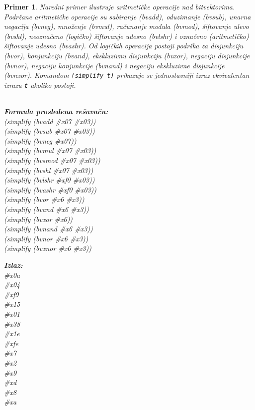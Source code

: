 \documentclass[12pt,oneside]{memoir}
\newtheorem{primer}{Primer}
\begin{document}
\begin{primer} Naredni primer ilustruje aritmetičke operacije nad bitvektorima. Podržane aritmetičke operacije su sabiranje (bvadd), oduzimanje (bvsub), unarna negacija (bvneg), množenje (bvmul), računanje modula (bvmod), šiftovanje ulevo (bvshl), neoznačeno (logičko) šiftovanje udesno (bvlshr) i označeno (aritmetičko) šiftovanje udesno (bvashr). Od logičkih operacija postoji podrška za disjunkciju (bvor), konjunkciju (bvand), ekskluzivnu disjunkciju (bvxor), negaciju disjunkcije (bvnor), negaciju konjunkcije (bvnand) i negaciju ekskluzivne disjunkcije (bvnxor).
Komandom \texttt{(simplify t)} prikazuje se jednostavniji izraz ekvivalentan izrazu \texttt{t} ukoliko postoji.
\\\\
\begin{minipage}[b]{0.5\textwidth}
\textbf{Formula prosleđena rešavaču:}
\\(simplify (bvadd \#x07 \#x03)) 
\\(simplify (bvsub \#x07 \#x03)) 
\\(simplify (bvneg \#x07))       
\\(simplify (bvmul \#x07 \#x03)) 
\\(simplify (bvsmod \#x07 \#x03)) 
\\(simplify (bvshl \#x07 \#x03)) 
\\(simplify (bvlshr \#xf0 \#x03))  
\\(simplify (bvashr \#xf0 \#x03))  
\\(simplify (bvor \#x6 \#x3)) 
\\(simplify (bvand \#x6 \#x3))  
\\(simplify (bvxor \#x6)) 
\\(simplify (bvnand \#x6 \#x3)) 
\\(simplify (bvnor \#x6 \#x3)) 
\\(simplify (bvxnor \#x6 \#x3)) 
\end{minipage}
\hspace{2.5cm}
\begin{minipage}[b]{0.5\textwidth}
\textbf{Izlaz:}
\\\#x0a 
\\\#x04 
\\\#xf9 
\\\#x15 
\\\#x01 
\\\#x38 
\\\#x1e 
\\\#xfe
\\\#x7 
\\\#x2 
\\\#x9 
\\\#xd 
\\\#x8 
\\\#xa
\end{minipage}

\end{primer}
\end{document}
